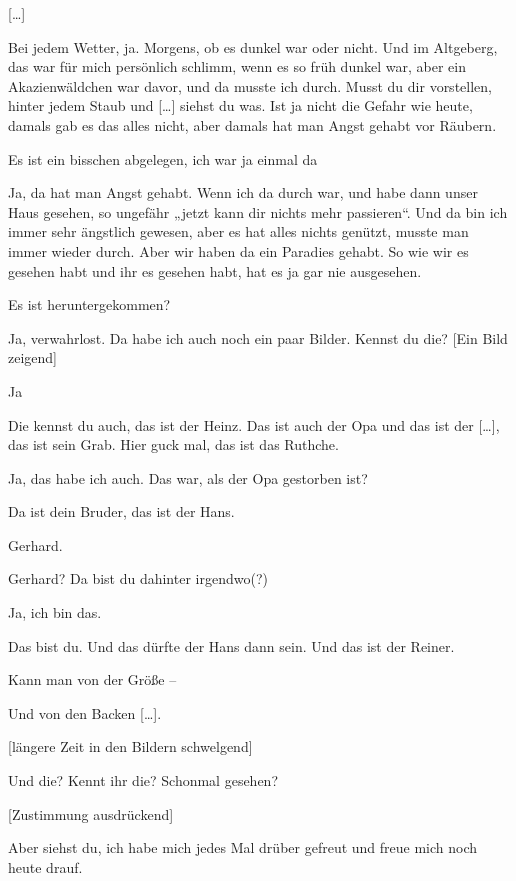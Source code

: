 \documentclass[ngerman,]{article}
\providecommand{\tightlist}{%
  \setlength{\itemsep}{0pt}\setlength{\parskip}{0pt}}
\begin{document}
\begin{multicols}{2}
{[}\ldots{}{]}

\begin{description}
\tightlist
\item[Käthe]
Bei jedem Wetter, ja. Morgens, ob es dunkel war oder nicht. Und im
Altgeberg, das war für mich persönlich schlimm, wenn es so früh dunkel
war, aber ein Akazienwäldchen war davor, und da musste ich durch. Musst
du dir vorstellen, hinter jedem Staub und {[}\ldots{}{]} siehst du was.
Ist ja nicht die Gefahr wie heute, damals gab es das alles nicht, aber
damals hat man Angst gehabt vor Räubern.
\item[Ruth]
Es ist ein bisschen abgelegen, ich war ja einmal da
\item[Käthe]
Ja, da hat man Angst gehabt. Wenn ich da durch war, und habe dann unser
Haus gesehen, so ungefähr „jetzt kann dir nichts mehr passieren“. Und da
bin ich immer sehr ängstlich gewesen, aber es hat alles nichts genützt,
musste man immer wieder durch. Aber wir haben da ein Paradies gehabt. So
wie wir es gesehen habt und ihr es gesehen habt, hat es ja gar nie
ausgesehen.
\item[Ruth]
Es ist heruntergekommen?
\item[Käthe]
Ja, verwahrlost. Da habe ich auch noch ein paar Bilder. Kennst du die?
{[}Ein Bild zeigend{]}
\item[Ruth]
Ja
\item[Käthe]
Die kennst du auch, das ist der Heinz. Das ist auch der Opa und das ist
der {[}\ldots{}{]}, das ist sein Grab. Hier guck mal, das ist das
Ruthche.
\item[Ruth]
Ja, das habe ich auch. Das war, als der Opa gestorben ist?
\item[Käthe]
Da ist dein Bruder, das ist der Hans.
\item[Ruth]
Gerhard.
\item[Käthe]
Gerhard? Da bist du dahinter irgendwo(?)
\item[Ruth]
Ja, ich bin das.
\item[Käthe]
Das bist du. Und das dürfte der Hans dann sein. Und das ist der Reiner.
\item[Ruth]
Kann man von der Größe –
\item[Käthe]
Und von den Backen {[}\ldots{}{]}.
\end{description}

{[}längere Zeit in den Bildern schwelgend{]}

\begin{description}
\tightlist
\item[Käthe]
Und die? Kennt ihr die? Schonmal gesehen?
\item[Ruth]
{[}Zustimmung ausdrückend{]}
\item[Käthe]
Aber siehst du, ich habe mich jedes Mal drüber gefreut und freue mich
noch heute drauf.
\end{description}


\end{multicols}
\end{document}
